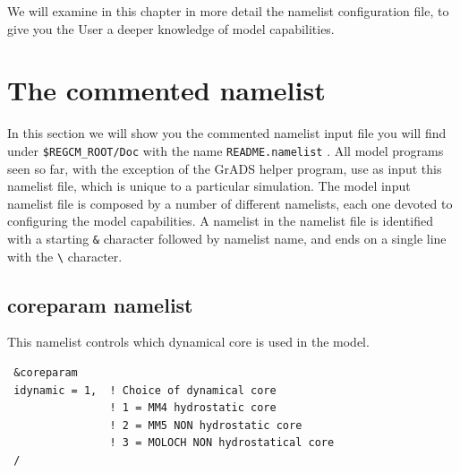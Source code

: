 
We will examine in this chapter in more detail the namelist configuration file,
to give you the User a deeper knowledge of model capabilities.

\section{The commented namelist}

In this section we will show you the commented namelist input file you will
find under \verb=$REGCM_ROOT/Doc= with the name \verb=README.namelist= .
All model programs seen so far, with the exception of the GrADS helper program,
use as input this namelist file, which is unique to a particular simulation.
The model input namelist file is composed by a number of different namelists,
each one devoted to configuring the model capabilities.
A namelist in the namelist file is identified with a starting \verb=&= character
followed by namelist name, and ends on a single line with the \verb=\=
character.

\subsection{coreparam namelist}
\label{coreparam}

This namelist controls which dynamical core is used in the model.

{\footnotesize
\begin{Verbatim}
 &coreparam
 idynamic = 1,  ! Choice of dynamical core
                ! 1 = MM4 hydrostatic core
                ! 2 = MM5 NON hydrostatic core
                ! 3 = MOLOCH NON hydrostatical core
 /
\end{Verbatim}
}

